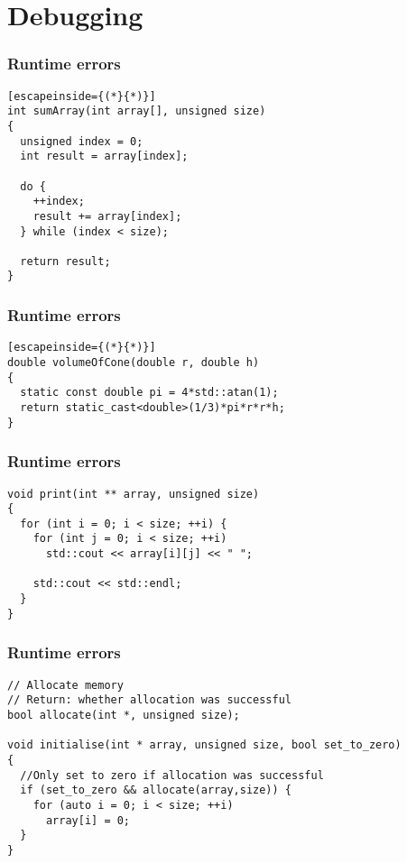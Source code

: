 \documentclass[14pt,a4paper,dvipsnames,usenames]{beamer}
\begin{document}
\begin{frame}[fragile]
\end{frame}

\section{Debugging}

\frame[plain]{\sectionpage}

\begin{frame}[fragile]
  \frametitle{Runtime errors}

  \begin{lstlisting}[escapeinside={(*}{*)}]
int sumArray(int array[], unsigned size)
{
  unsigned index = 0;
  int result = array[index];

  do {
    ++index;
    result += array[index];
  } while (index < size);

  return result;
}
  \end{lstlisting}
  
\end{frame}

\begin{frame}[fragile]
  \frametitle{Runtime errors}

  \begin{lstlisting}[escapeinside={(*}{*)}]
double volumeOfCone(double r, double h)
{
  static const double pi = 4*std::atan(1);
  return static_cast<double>(1/3)*pi*r*r*h;
}
  \end{lstlisting}
  
\end{frame}

\begin{frame}[fragile]
  \frametitle{Runtime errors}

  \begin{lstlisting}
void print(int ** array, unsigned size)
{
  for (int i = 0; i < size; ++i) {
    for (int j = 0; i < size; ++i)
      std::cout << array[i][j] << " ";

    std::cout << std::endl;
  }
}
  \end{lstlisting}
  
\end{frame}

\begin{frame}[fragile]
  \frametitle{Runtime errors}

  \begin{lstlisting}[basicstyle=\ttfamily\fontsize{8pt}{8pt}\selectfont]
// Allocate memory
// Return: whether allocation was successful
bool allocate(int *, unsigned size);

void initialise(int * array, unsigned size, bool set_to_zero)
{
  //Only set to zero if allocation was successful
  if (set_to_zero && allocate(array,size)) {
    for (auto i = 0; i < size; ++i)
      array[i] = 0;
  }
}
  \end{lstlisting}
  
\end{frame}
\end{document}
